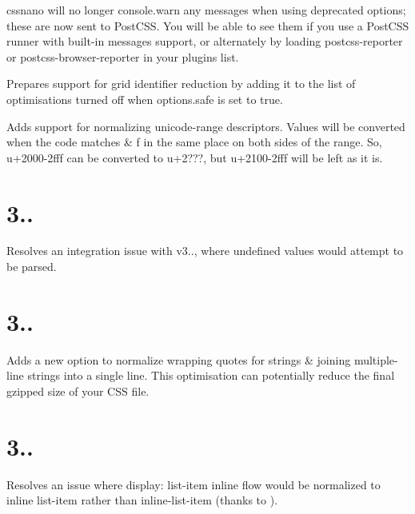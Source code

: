 
\begin{DoxyItemize}
\item cssnano will no longer {\ttfamily console.\+warn} any messages when using deprecated options; these are now sent to Post\+C\+SS. You will be able to see them if you use a Post\+C\+SS runner with built-\/in messages support, or alternately by loading {\ttfamily postcss-\/reporter} or {\ttfamily postcss-\/browser-\/reporter} in your plugins list.
\item Prepares support for {\ttfamily grid} identifier reduction by adding it to the list of optimisations turned off when {\ttfamily options.\+safe} is set to {\ttfamily true}.
\item Adds support for normalizing {\ttfamily unicode-\/range} descriptors. Values will be converted when the code matches {} \& {\ttfamily f} in the same place on both sides of the range. So, {\ttfamily u+2000-\/2fff} can be converted to {\ttfamily u+2???}, but {\ttfamily u+2100-\/2fff} will be left as it is.
\end{DoxyItemize}

\section*{3..}


\begin{DoxyItemize}
\item Resolves an integration issue with {\ttfamily v3..}, where {\ttfamily undefined} values would attempt to be parsed.
\end{DoxyItemize}

\section*{3..}


\begin{DoxyItemize}
\item Adds a new option to normalize wrapping quotes for strings \& joining multiple-\/line strings into a single line. This optimisation can potentially reduce the final gzipped size of your C\+SS file.
\end{DoxyItemize}

\section*{3..}


\begin{DoxyItemize}
\item Resolves an issue where {\ttfamily display\+: list-\/item inline flow} would be normalized to {\ttfamily inline list-\/item} rather than {\ttfamily inline-\/list-\/item} (thanks to ).
\end{DoxyItemize}

